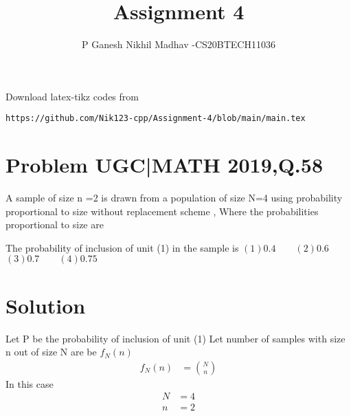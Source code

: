 \documentclass[journal,12pt,twocolumn]{IEEEtran}
\begin{document}
     \def\rightbox#1{\makebox[0in][r]{#1}}
     \def\centbox#1{\makebox[0in]{#1}}
     \def\topbox#1{\raisebox{-\baselineskip}[0in][0in]{#1}}
     \def\midbox#1{\raisebox{-0.5\baselineskip}[0in][0in]{#1}}
\vspace{3cm}
\title{Assignment 4}
\author{P Ganesh Nikhil Madhav -CS20BTECH11036}
\maketitle
\newpage
\bigskip
\renewcommand{\thefigure}{\theenumi}
\renewcommand{\thetable}{\theenumi}
Download latex-tikz codes from 
%
\begin{lstlisting}
https://github.com/Nik123-cpp/Assignment-4/blob/main/main.tex
\end{lstlisting}
\section{ Problem UGC|MATH 2019,Q.58}
A sample of size n =2 is drawn from a population of size N=4 using probability proportional to size without replacement scheme , Where the probabilities proportional to size are

\begin{table}[h!]
\end{table}  

The probability of inclusion of unit (1) in the sample is 
\newline
$(1) 0.4 \quad \quad  (2) 0.6$
\newline
$(3) 0.7 \quad  \quad (4) 0.75$
\section{Solution }
Let P be the probability of inclusion of unit (1)
\newline
Let number of  samples with size n out of size N are be $f_{N}(n)$ 
\begin{align}
    f_{N}(n)&=\binom{N}{n}
\end{align}
In this case
\begin{align}
    N&=4
    \\
    n&=2
\end{align}
\end{document}
